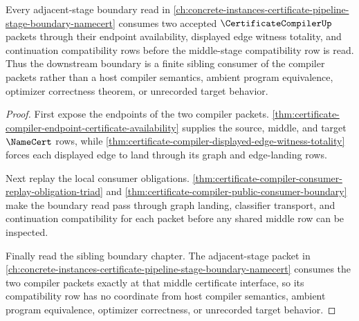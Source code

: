 \begin{theorem}
\label{thm:certificate-compiler-downstream-boundary-sibling-link}
Every adjacent-stage boundary read in \autoref{ch:concrete-instances-certificate-pipeline-stage-boundary-namecert} consumes two accepted $\CertificateCompilerUp$ packets through their endpoint availability, displayed edge witness totality, and continuation compatibility rows before the middle-stage compatibility row is read. Thus the downstream boundary is a finite sibling consumer of the compiler packets rather than a host compiler semantics, ambient program equivalence, optimizer correctness theorem, or unrecorded target behavior.
\end{theorem}
\begin{proof}
First expose the endpoints of the two compiler packets. \autoref{thm:certificate-compiler-endpoint-certificate-availability} supplies the source, middle, and target $\NameCert$ rows, while \autoref{thm:certificate-compiler-displayed-edge-witness-totality} forces each displayed edge to land through its graph and edge-landing rows.

Next replay the local consumer obligations. \autoref{thm:certificate-compiler-consumer-replay-obligation-triad} and \autoref{thm:certificate-compiler-public-consumer-boundary} make the boundary read pass through graph landing, classifier transport, and continuation compatibility for each packet before any shared middle row can be inspected.

Finally read the sibling boundary chapter. The adjacent-stage packet in \autoref{ch:concrete-instances-certificate-pipeline-stage-boundary-namecert} consumes the two compiler packets exactly at that middle certificate interface, so its compatibility row has no coordinate from host compiler semantics, ambient program equivalence, optimizer correctness, or unrecorded target behavior.
\end{proof}

